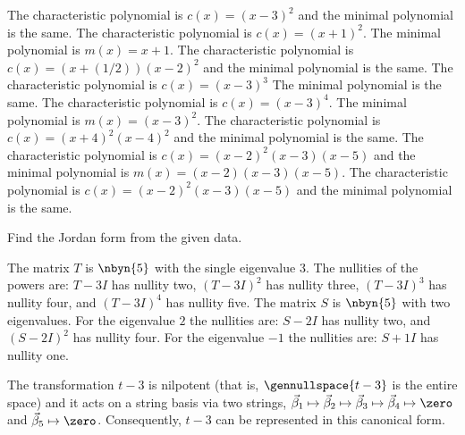 \begin{exercises}
    \begin{answer}
      \begin{exparts}
        \partsitem The characteristic polynomial is $c(x)=(x-3)^2$ and
          the minimal polynomial is the same.
        \partsitem The characteristic polynomial is $c(x)=(x+1)^2$.
          The minimal polynomial is $m(x)=x+1$.
        \partsitem The characteristic polynomial is 
          $c(x)=(x+(1/2))(x-2)^2$ and
          the minimal polynomial is the same.
        \partsitem The characteristic polynomial is $c(x)=(x-3)^3$
          The minimal polynomial is the same.
        \partsitem The characteristic polynomial is $c(x)=(x-3)^4$.
          The minimal polynomial is $m(x)=(x-3)^2$.
        \partsitem The characteristic polynomial is $c(x)=(x+4)^2(x-4)^2$ and
          the minimal polynomial is the same.
        \partsitem The characteristic polynomial is 
          $c(x)=(x-2)^2(x-3)(x-5)$ and
          the minimal polynomial is $m(x)=(x-2)(x-3)(x-5)$.
        \partsitem The characteristic polynomial is 
          $c(x)=(x-2)^2(x-3)(x-5)$ and
          the minimal polynomial is the same.
      \end{exparts}
    \end{answer}
  \recommended \item
    Find the Jordan form from the given data.
    \begin{exparts}
       \partsitem The matrix 
         \( T \) is \( \nbyn{5} \) with the single eigenvalue $3$.
         The nullities of the powers are:
         \( T-3I \) has nullity two, \( (T-3I)^2 \) has nullity three,
         \( (T-3I)^3 \) has nullity four, and \( (T-3I)^4 \) has nullity
         five.
       \partsitem The matrix \( S \) is \( \nbyn{5} \) with two eigenvalues.
         For the eigenvalue $2$ the nullities are:
         \( S-2I \) has nullity two, and \( (S-2I)^2 \) has nullity four.
         For the eigenvalue $-1$ the nullities are:
         \( S+1I \) has nullity one.
    \end{exparts}
    \begin{answer}
      \begin{exparts}
         \partsitem The transformation $t-3$ is nilpotent 
          (that is, $\gennullspace{t-3}$ is the entire space)
          and it acts on a string basis via two strings, 
          $\vec{\beta}_1\mapsto\vec{\beta}_2\mapsto\vec{\beta}_3
            \mapsto\vec{\beta}_4\mapsto\zero$
          and $\vec{\beta}_5\mapsto\zero$.
          Consequently, $t-3$ can be represented in this canonical form.
          \begin{equation*}

\end{equation*}
\end{exparts}
\end{answer}
\end{exercises}
